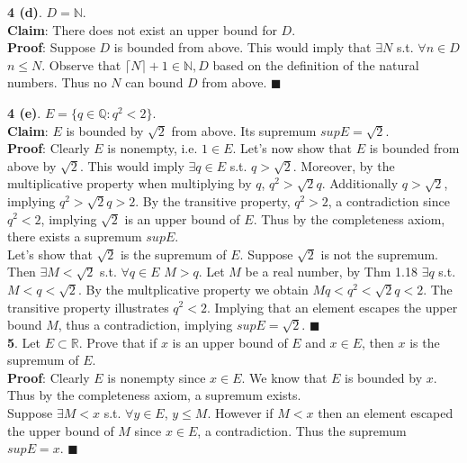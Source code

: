 \documentclass[ 12pt ]{article}
\begin{document}
\noindent \textbf{4 (d)}. $D = \mathbb{N}$. \\

\noindent \textbf{Claim}: There does not exist an upper bound for $D$. \\

\noindent \textbf{Proof}: Suppose $D$ is bounded from above. This would imply
	that $\exists N$ s.t. $\forall n \in D$ $n \leq N$. Observe that
	$\lceil N \rceil + 1 \in \mathbb{N}, D$ based on the definition of the
	natural numbers. Thus no $N$ can bound $D$ from above. $\blacksquare$
\newpage

\noindent \textbf{4 (e)}. $E = \{ q \in \mathbb{Q}: q^2 < 2 \}$. \\

\noindent \textbf{Claim}: $E$ is bounded by $\sqrt{2}$ from above. Its supremum
	$supE = \sqrt{2}$. \\

\noindent \textbf{Proof}: Clearly $E$ is nonempty, i.e. $1 \in E$.
	Let's now show that $E$ is bounded from above by $\sqrt{2}$. This would
	imply $\exists q \in E$ s.t. $q > \sqrt{2}$. Moreover, by the
	multiplicative property when multiplying by $q$, $q^2 > \sqrt{2}q$.
	Additionally $q > \sqrt{2}$, implying $q^2 > \sqrt{2}q > 2$. By the
	transitive property, $q^2 > 2$, a contradiction since $q^2 < 2$,
	implying $\sqrt{2}$ is an upper bound of $E$. Thus by the completeness
	axiom, there exists a supremum $supE$. \\

\noindent Let's show that $\sqrt{2}$ is the supremum of $E$. Suppose $\sqrt{2}$ is
	not the supremum. Then $\exists M < \sqrt{2}$ s.t. $\forall q \in E$
	$M > q$. Let $M$ be a real number, by Thm 1.18 $\exists q$ s.t.
	$M < q < \sqrt{2}$. By the multplicative property we obtain
	$Mq < q^2 < \sqrt{2}q < 2$. The transitive property illustrates
	$q^2 < 2$. Implying that an element escapes the upper bound $M$, thus
	a contradiction, implying $supE = \sqrt{2}$. $\blacksquare$ \\


\noindent \textbf{5}. Let $E \subset \mathbb{R}$. Prove that if $x$ is an upper
	bound of $E$ and $x \in E$, then $x$ is the supremum of $E$. \\

\noindent \textbf{Proof}: Clearly $E$ is nonempty since $x \in E$. We know that
	$E$ is bounded by $x$. Thus by the completeness axiom, a supremum exists. \\

\noindent Suppose $\exists M < x$ s.t. $\forall y \in E$, $y \leq M$. However if
	$M < x$ then an element escaped the upper bound of $M$ since $x \in E$,
	a contradiction. Thus the supremum $supE = x$. $\blacksquare$
\end{document}
